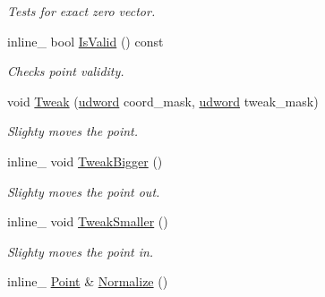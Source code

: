\begin{DoxyCompactItemize}
\begin{DoxyCompactList}\small\item\em Tests for exact zero vector. \end{DoxyCompactList}\item 
inline\+\_\+ bool \hyperlink{classPoint_ab4d13e06edd89020efc414cb84fbb28e}{Is\+Valid} () const \hypertarget{classPoint_ab4d13e06edd89020efc414cb84fbb28e}{}\label{classPoint_ab4d13e06edd89020efc414cb84fbb28e}

\begin{DoxyCompactList}\small\item\em Checks point validity. \end{DoxyCompactList}\item 
void \hyperlink{classPoint_af2dc20d8d8909d011c9617dae274cfa7}{Tweak} (\hyperlink{IceTypes_8h_a44c6f1920ba5551225fb534f9d1a1733}{udword} coord\+\_\+mask, \hyperlink{IceTypes_8h_a44c6f1920ba5551225fb534f9d1a1733}{udword} tweak\+\_\+mask)\hypertarget{classPoint_af2dc20d8d8909d011c9617dae274cfa7}{}\label{classPoint_af2dc20d8d8909d011c9617dae274cfa7}

\begin{DoxyCompactList}\small\item\em Slighty moves the point. \end{DoxyCompactList}\item 
inline\+\_\+ void \hyperlink{classPoint_a02a06a034d405f8d043c347b3c390339}{Tweak\+Bigger} ()\hypertarget{classPoint_a02a06a034d405f8d043c347b3c390339}{}\label{classPoint_a02a06a034d405f8d043c347b3c390339}

\begin{DoxyCompactList}\small\item\em Slighty moves the point out. \end{DoxyCompactList}\item 
inline\+\_\+ void \hyperlink{classPoint_a32670367f5b97b83cc062d90fb5f551f}{Tweak\+Smaller} ()\hypertarget{classPoint_a32670367f5b97b83cc062d90fb5f551f}{}\label{classPoint_a32670367f5b97b83cc062d90fb5f551f}

\begin{DoxyCompactList}\small\item\em Slighty moves the point in. \end{DoxyCompactList}\item 
inline\+\_\+ \hyperlink{classPoint}{Point} \& \hyperlink{classPoint_afe1bb2bb5081371fe58ba6a0835b14dc}{Normalize} ()\hypertarget{classPoint_afe1bb2bb5081371fe58ba6a0835b14dc}{}\label{classPoint_afe1bb2bb5081371fe58ba6a0835b14dc}


\end{DoxyCompactItemize}
